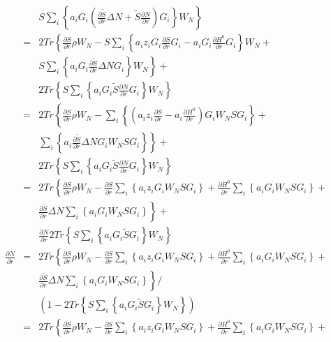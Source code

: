 \documentclass{article}
\begin{document}
\begin{eqnarray*}
 & & \left. S \sum_i \left\{ a_i G_i \left( \frac{\partial \tilde{S}}{\partial r} \Delta N + \tilde{S} \frac{\partial N}{\partial r} \right) G_i \right\} W_N \right\} \\
& = & 2 Tr \left\{ \frac{\partial S}{\partial r} \rho W_N - S \sum_i \left\{ a_i z_i G_i \frac{\partial S}{\partial r} G_i - a_i G_i \frac{\partial H^0}{\partial r} G_i \right\} W_N + \right. \\
 & & \left. S \sum_i \left\{ a_i G_i \frac{\partial \tilde{S}}{\partial r} \Delta N G_i \right\} W_N \right\} + \\
 & & 2 Tr \left\{ S \sum_i \left\{ a_i G_i \tilde{S} \frac{\partial N}{\partial r} G_i \right\} W_N \right\} \\
& = & 2 Tr \left\{ \frac{\partial S}{\partial r} \rho W_N - \sum_i \left\{ \left( a_i z_i \frac{\partial S}{\partial r} - a_i \frac{\partial H^0}{\partial r} \right) G_i W_N S G_i \right\} + \right. \\
 & & \left. \sum_i \left\{ a_i \frac{\partial \tilde{S}}{\partial r} \Delta N G_i W_N S G_i \right\} \right\} + \\
 & & 2 Tr \left\{ S \sum_i \left\{ a_i G_i \tilde{S} \frac{\partial N}{\partial r} G_i \right\} W_N \right\} \\
& = & 2 Tr \left\{ \frac{\partial S}{\partial r} \rho W_N - \frac{\partial S}{\partial r} \sum_i \left\{ a_i z_i G_i W_N S G_i \right\} + \frac{\partial H^0}{\partial r} \sum_i \left\{ a_i G_i W_N S G_i \right\} + \right. \\
 & & \left. \frac{\partial \tilde{S}}{\partial r} \Delta N \sum_i \left\{ a_i  G_i W_N S G_i \right\} \right\} + \\
 & & \frac{\partial N}{\partial r} 2 Tr \left\{ S \sum_i \left\{ a_i G_i \tilde{S} G_i \right\} W_N \right\} \\
\frac{\partial N}{\partial r} & = &
2 Tr \left\{ \frac{\partial S}{\partial r} \rho W_N - \frac{\partial S}{\partial r} \sum_i \left\{ a_i z_i G_i W_N S G_i \right\} + \frac{\partial H^0}{\partial r} \sum_i \left\{ a_i G_i W_N S G_i \right\} + \right. \\
 & & \left. \frac{\partial \tilde{S}}{\partial r} \Delta N \sum_i \left\{ a_i  G_i W_N S G_i \right\} \right\} / \\
 & & \left(1 -  2 Tr \left\{ S \sum_i \left\{ a_i G_i \tilde{S} G_i \right\} W_N \right\} \right) \\
& = & 2 Tr \left\{ \frac{\partial S}{\partial r} \rho W_N - \frac{\partial S}{\partial r} \sum_i \left\{ a_i z_i G_i W_N S G_i \right\} + \frac{\partial H^0}{\partial r} \sum_i \left\{ a_i G_i W_N S G_i \right\} + \right. \\

\end{eqnarray*}
\end{document}

